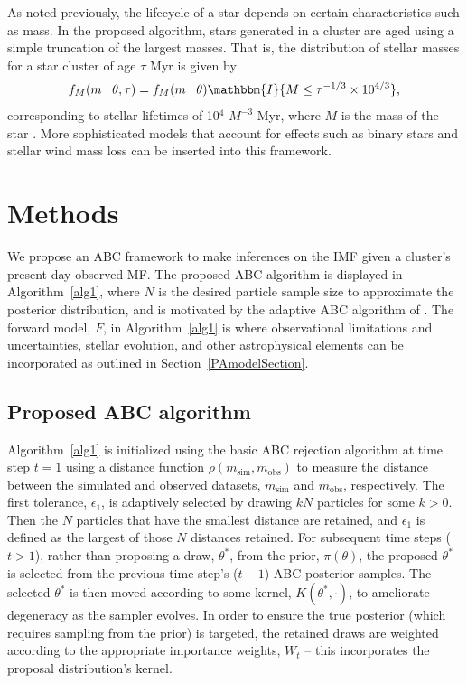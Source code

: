 \documentclass[12pt]{article}
\newcommand{\indic}{\mathbbm{I}}
\newcommand{\msim}{m_{\text{sim}}}
\newcommand{\mobs}{m_{\text{obs}}}
\begin{document}
As noted previously, the lifecycle of a star depends on certain characteristics such as mass.  In the proposed algorithm, stars generated in a cluster are aged using a simple truncation of the largest masses.  
That is, the distribution of stellar masses for a star cluster of age $\tau$ Myr is given by
	\begin{align}
	f_M(m \mid \theta, \tau) = f_M(m \mid \theta) \indic \{M \leq \tau^{-1/3} \times 10^{4/3}\} \text{,}
	\label{eq:age}
	\end{align}
corresponding to stellar lifetimes of 10$^4$ $M^{-3}$ Myr, where $M$ is the mass of the star \citep{hansen2004, Chaisson:2011}. 
More sophisticated models that account for effects such as binary stars and stellar wind mass loss can be inserted into this framework.  



\section{Methods}
\label{methodSec}

We propose an ABC framework to make inferences on the IMF given a cluster's present-day observed MF.  The proposed ABC algorithm is displayed in Algorithm~\eqref{alg1}, where $N$ is the desired particle sample size to approximate the posterior distribution, and is motivated by the adaptive ABC algorithm of \cite{beaumont2009}.  The forward model, $F$, in Algorithm~\eqref{alg1} is where observational limitations and uncertainties, stellar evolution, and other astrophysical elements can be incorporated as outlined in Section~\ref{PAmodelSection}.


\subsection{Proposed ABC algorithm}
Algorithm~\eqref{alg1} is initialized using the basic ABC rejection algorithm at time step $t = 1$ using a distance function $\rho(\msim, \mobs)$ to measure the distance between the simulated and observed datasets, $\msim$ and $\mobs$, respectively.  The first tolerance, $\epsilon_1$, is adaptively selected by drawing $kN$ particles for some $k >0$.  Then the $N$ particles that have the smallest distance are retained, and $\epsilon_1$ is defined as the largest of those $N$ distances retained.
%
For subsequent time steps ($t > 1$), rather than proposing a draw, $\theta^*$, from the prior, $\pi(\theta)$, the proposed $\theta^*$ is selected from the previous time step's ($t-1$) ABC posterior samples.  The selected $\theta^*$ is then moved according to some kernel, $K(\theta^*, \cdot)$, to ameliorate degeneracy as the sampler evolves.  In order to ensure the true posterior (which requires sampling from the prior) is targeted, the retained draws are weighted according to the appropriate importance weights, $W_t$ -- this incorporates the proposal distribution's kernel.
\end{document}
